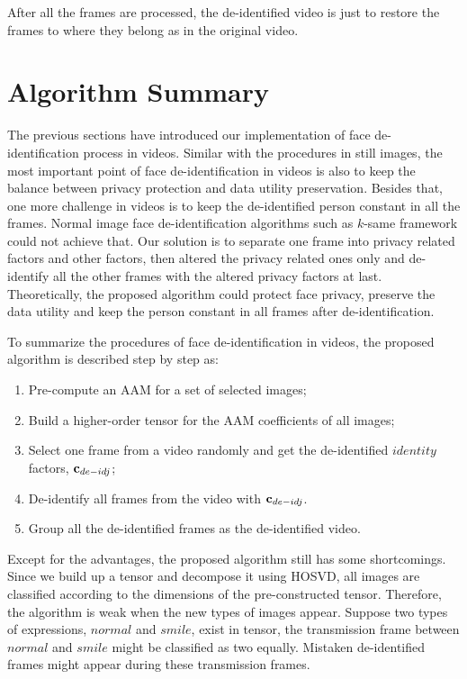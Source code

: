 	After all the frames are processed, the de-identified video is just to
	restore the frames to where they belong as in the original video. 

	\section{Algorithm Summary}
	\label{sec:video_summary}

	The previous sections have introduced our implementation of face de-identification
	process in videos. Similar with the procedures in still images, the most
	important point of face de-identification in videos is also to keep the balance
	between privacy protection and data utility preservation. Besides that, one
	more challenge in videos is to keep the de-identified person constant in all
	the frames. Normal image face de-identification algorithms such as $k$-same framework
	could not achieve that. Our solution is to separate one frame into privacy
	related factors and other factors, then altered the privacy related ones only and 
	de-identify all the other frames with the altered privacy factors at last.
	Theoretically, the proposed algorithm could protect face privacy, preserve
	the data utility and keep the person constant in all frames after de-identification.

	To summarize the procedures of face de-identification in videos, the proposed 
	algorithm is described step by step as:
	\begin{enumerate}
	\item Pre-compute an AAM for a set of selected images;
	\item Build a higher-order tensor for the AAM coefficients of all images;
	\item Select one frame from a video randomly and get the de-identified $identity$ factors, ${\bf c}_{de-idj}$;
	\item De-identify all frames from the video with ${\bf c}_{de-idj}$.
	\item Group all the de-identified frames as the de-identified video.
	\end{enumerate}

	Except for the advantages, the proposed algorithm still has some shortcomings.
	Since we build up a tensor and decompose it using HOSVD, all images
	are classified according to the dimensions of the pre-constructed tensor. 
	Therefore, the algorithm is weak when the new types of images appear. 
	Suppose two types of expressions, $normal$ and $smile$, exist in tensor,
	the transmission frame between $normal$ and $smile$ might be classified 
	as two equally. Mistaken de-identified frames might appear during these
	transmission frames. 

